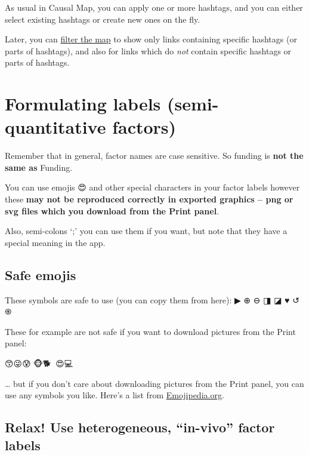 \documentclass[
]{book}
\begin{document}
As usual in Causal Map, you can apply one or more hashtags, and you can either select existing hashtags or create new ones on the fly.

Later, you can \href{https://guide.causalmap.app/analysis.html\#filtering-the-map-by-link-hashtag-memo}{filter the map} to show only links containing specific hashtags (or parts of hashtags), and also for links which do \emph{not} contain specific hashtags or parts of hashtags.

\hypertarget{formulating-labels-semi-quantitative-factors}{%
\section{Formulating labels (semi-quantitative factors)}\label{formulating-labels-semi-quantitative-factors}}

Remember that in general, factor names are case sensitive. So funding is \textbf{not the same as} Funding.

You can use emojis 😍 and other special characters in your factor labels however these \textbf{may not be reproduced correctly in exported graphics -- png or svg files which you download from the Print panel}.

Also, semi-colons `;' you can use them if you want, but note that they have a special meaning in the app.

\hypertarget{safe-emojis}{%
\subsection{Safe emojis}\label{safe-emojis}}

These symbols are safe to use (you can copy them from here):
▶ ⊕ ⊖ ◨ ◪ ♥ ↺ ֍

These for example are not safe if you want to download pictures from the Print panel:

😙😜😰🤭🐵🐕🐉🦩😍💻

\ldots{} but if you don't care about downloading pictures from the Print panel, you can use any symbols you like. Here's a list from \href{https://emojipedia.org/}{Emojipedia.org}.

\hypertarget{relax-use-heterogeneous-in-vivo-factor-labels}{%
\subsection{Relax! Use heterogeneous, ``in-vivo'' factor labels}\label{relax-use-heterogeneous-in-vivo-factor-labels}}
\end{document}

